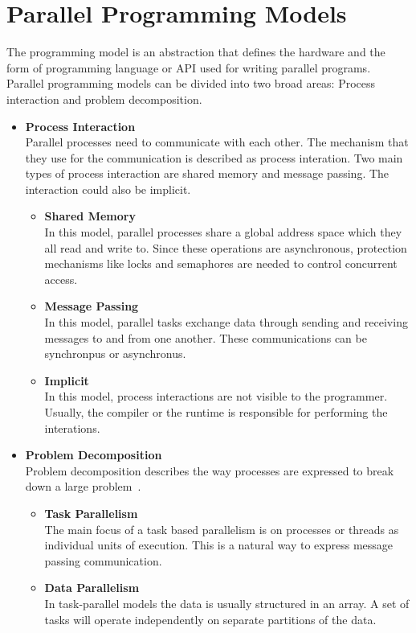 \section{Parallel Programming Models}
\label{sec:Introduction}
The programming model is an abstraction that defines the hardware and the form of programming language or API used for writing parallel programs.
Parallel programming models can be divided into two broad areas: Process interaction and problem decomposition.~\cite{parallelprogrammingmodels}
\begin{itemize}
\item \textbf{Process Interaction}\\
  Parallel processes need to communicate with each other. The mechanism that they use for the communication is described as process interation. Two main types of process interaction are shared memory and message passing. The interaction could also be implicit.
  \begin{itemize}
  \item \textbf{Shared Memory}\\
    In this model, parallel processes share a global address space which they all read and write to. Since these operations are asynchronous, protection mechanisms like locks and semaphores are needed to control concurrent access.
  \item \textbf{Message Passing}\\
    In this model, parallel tasks exchange data through sending and receiving messages to and from one another. These communications can be synchronpus or asynchronus.
  \item \textbf{Implicit}\\
    In this model, process interactions are not visible to the programmer. Usually, the compiler or the runtime is responsible for performing the interations.
  \end{itemize}
\item \textbf{Problem Decomposition}\\
Problem decomposition describes the way processes are expressed to break down a large problem~\cite{Quinn:2003:PPC:1211440}.
  \begin{itemize}
  \item \textbf{Task Parallelism}\\
    The main focus of a task based parallelism is on processes or threads as individual units of execution. This is a natural way to express message passing communication.
  \item \textbf{Data Parallelism}\\
    In task-parallel models the data is usually structured in an array. A set of tasks will operate independently on separate partitions of the data.     
  \end{itemize}
\end{itemize}


